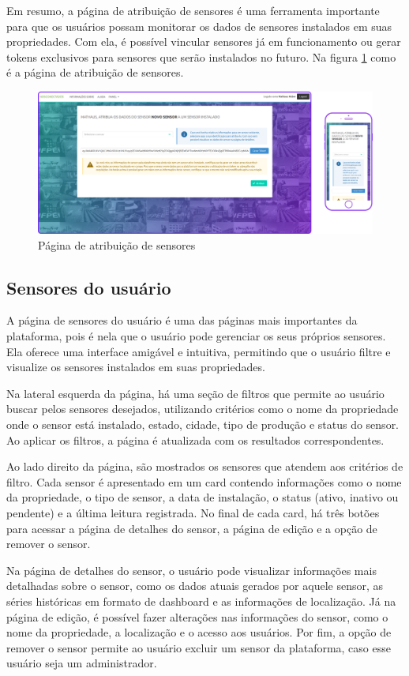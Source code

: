 \documentclass[tcc,capa]{texufpel}
\begin{document}
Em resumo, a página de atribuição de sensores é uma ferramenta importante para que os usuários possam monitorar os dados de sensores instalados em suas propriedades. Com ela, é possível vincular sensores já em funcionamento ou gerar tokens exclusivos para sensores que serão instalados no futuro. Na figura \ref{atribuicao} como é a página de atribuição de sensores.

\begin{figure}[htbp]
  \centering \includegraphics[scale=.2]{assets/atribuicao.png}
  \caption{Página de atribuição de sensores}
  \label{atribuicao}
\end{figure}
\newpage
\subsection{Sensores do usuário}
A página de sensores do usuário é uma das páginas mais importantes da plataforma, pois é nela que o usuário pode gerenciar os seus próprios sensores. Ela oferece uma interface amigável e intuitiva, permitindo que o usuário filtre e visualize os sensores instalados em suas propriedades.

Na lateral esquerda da página, há uma seção de filtros que permite ao usuário buscar pelos sensores desejados, utilizando critérios como o nome da propriedade onde o sensor está instalado, estado, cidade, tipo de produção e status do sensor. Ao aplicar os filtros, a página é atualizada com os resultados correspondentes.

Ao lado direito da página, são mostrados os sensores que atendem aos critérios de filtro. Cada sensor é apresentado em um card contendo informações como o nome da propriedade, o tipo de sensor, a data de instalação, o status (ativo, inativo ou pendente) e a última leitura registrada. No final de cada card, há três botões para acessar a página de detalhes do sensor, a página de edição e a opção de remover o sensor.

Na página de detalhes do sensor, o usuário pode visualizar informações mais detalhadas sobre o sensor, como os dados atuais gerados por aquele sensor, as séries históricas em formato de dashboard e as informações de localização. Já na página de edição, é possível fazer alterações nas informações do sensor, como o nome da propriedade, a localização e o acesso aos usuários. Por fim, a opção de remover o sensor permite ao usuário excluir um sensor da plataforma, caso esse usuário seja um administrador.
\end{document}

